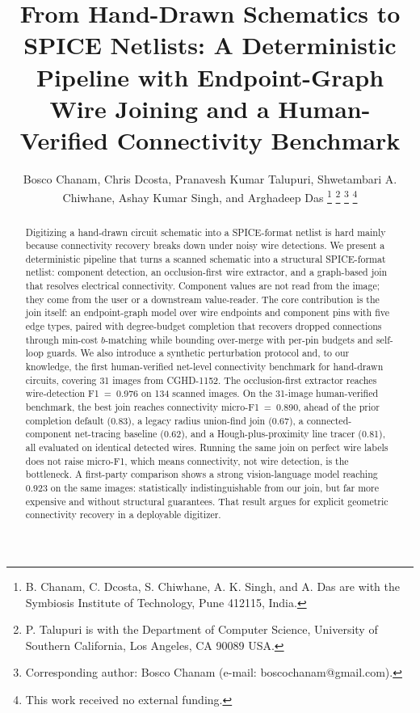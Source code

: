 \documentclass[journal]{IEEEtran}
\begin{document}
\title{From Hand-Drawn Schematics to SPICE Netlists: A Deterministic Pipeline with Endpoint-Graph Wire Joining and a Human-Verified Connectivity Benchmark}

\author{Bosco Chanam, Chris Dcosta, Pranavesh Kumar Talupuri, Shwetambari A. Chiwhane, Ashay Kumar Singh, and Arghadeep Das%
\thanks{B. Chanam, C. Dcosta, S. Chiwhane, A. K. Singh, and A. Das are with the Symbiosis Institute of Technology, Pune 412115, India.}%
\thanks{P. Talupuri is with the Department of Computer Science, University of Southern California, Los Angeles, CA 90089 USA.}%
\thanks{Corresponding author: Bosco Chanam (e-mail: boscochanam@gmail.com).}%
\thanks{This work received no external funding.}}

\maketitle

\begin{abstract}
Digitizing a hand-drawn circuit schematic into a SPICE-format netlist is hard mainly because connectivity recovery breaks down under noisy wire detections. We present a deterministic pipeline that turns a scanned schematic into a structural SPICE-format netlist: component detection, an occlusion-first wire extractor, and a graph-based join that resolves electrical connectivity. Component values are not read from the image; they come from the user or a downstream value-reader. The core contribution is the join itself: an endpoint-graph model over wire endpoints and component pins with five edge types, paired with degree-budget completion that recovers dropped connections through min-cost $b$-matching while bounding over-merge with per-pin budgets and self-loop guards. We also introduce a synthetic perturbation protocol and, to our knowledge, the first human-verified net-level connectivity benchmark for hand-drawn circuits, covering 31 images from CGHD-1152. The occlusion-first extractor reaches wire-detection F1~=~0.976 on 134 scanned images. On the 31-image human-verified benchmark, the best join reaches connectivity micro-F1~=~0.890, ahead of the prior completion default (0.83), a legacy radius union-find join (0.67), a connected-component net-tracing baseline (0.62), and a Hough-plus-proximity line tracer (0.81), all evaluated on identical detected wires. Running the same join on perfect wire labels does not raise micro-F1, which means connectivity, not wire detection, is the bottleneck. A first-party comparison shows a strong vision-language model reaching 0.923 on the same images: statistically indistinguishable from our join, but far more expensive and without structural guarantees. That result argues for explicit geometric connectivity recovery in a deployable digitizer.
\end{abstract}
\end{document}
